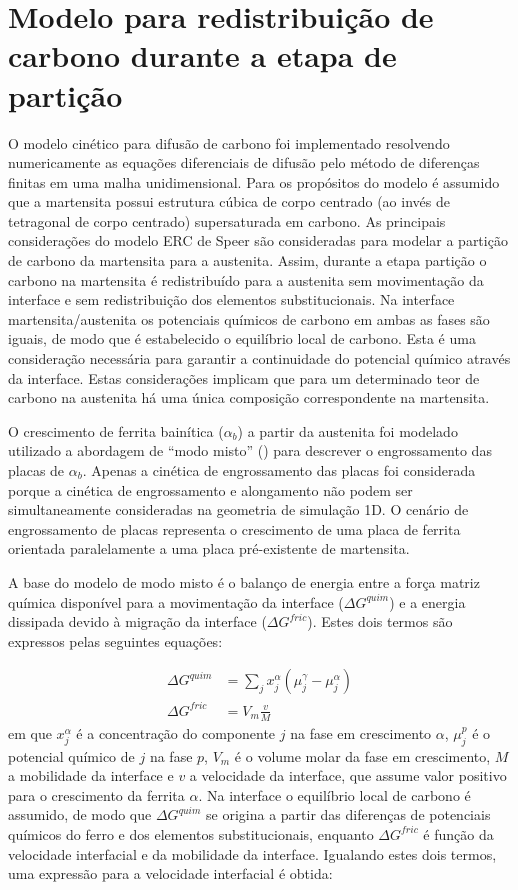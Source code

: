 \section{Modelo para redistribuição de carbono durante a etapa de partição}

\label{sec:modelo_cinetico}

O modelo cinético para difusão de carbono foi implementado resolvendo numericamente as equações diferenciais de difusão pelo método de diferenças finitas em uma malha unidimensional. Para os propósitos do modelo é assumido que a martensita possui estrutura cúbica de corpo centrado (ao invés de tetragonal de corpo centrado) supersaturada em carbono. As principais considerações do modelo ERC de Speer são consideradas para modelar a partição de carbono da martensita para a austenita. Assim, durante a etapa partição o carbono na martensita é redistribuído para a austenita sem movimentação da interface e sem redistribuição dos elementos substitucionais. Na interface martensita/austenita os potenciais químicos de carbono em ambas as fases são iguais, de modo que é estabelecido o equilíbrio local de carbono. Esta é uma consideração necessária para garantir a continuidade do potencial químico através da interface. Estas considerações implicam que para um determinado teor de carbono na austenita há uma única composição correspondente na martensita.

O crescimento de ferrita bainítica ($\alpha_b$) a partir da austenita foi modelado utilizado a abordagem de ``modo misto'' () para descrever o engrossamento das placas de $\alpha_b$. Apenas a cinética de engrossamento das placas foi considerada porque a cinética de engrossamento e alongamento não podem ser simultaneamente consideradas na geometria de simulação 1D. O cenário de engrossamento de placas representa o crescimento de uma placa de ferrita orientada paralelamente a uma placa pré-existente de martensita.

A base do modelo de modo misto é o balanço de energia entre a força matriz química disponível para a movimentação da interface ($\Delta G^{quim}$) e a energia dissipada devido à migração da interface ($\Delta G^{fric}$). Estes dois termos são expressos pelas seguintes equações:

\begin{align}
  \Delta G^{quim} &= \sum_j x_j^\alpha \left( \mu_j^{\gamma} - \mu_j^{\alpha} \right) \label{eq:F_quim}\\
  \Delta G^{fric} &= V_m \frac{v}{M} \label{eq:F_fric}
\end{align}
%
em que $x_j^\alpha$ é a concentração do componente $j$ na fase em crescimento $\alpha$, $\mu_j^p$ é o potencial químico de $j$ na fase $p$, $V_m$ é o volume molar da fase em crescimento, $M$ a mobilidade da interface e $v$ a velocidade da interface, que assume valor positivo para o crescimento da ferrita $\alpha$. Na interface o equilíbrio local de carbono é assumido, de modo que $\Delta G^{quim}$ se origina a partir das diferenças de potenciais químicos do ferro e dos elementos substitucionais, enquanto $\Delta G^{fric}$ é função da velocidade interfacial e da mobilidade da interface. Igualando estes dois termos, uma expressão para a velocidade interfacial é obtida:


